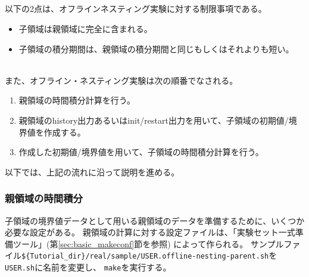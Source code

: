 \subsection{\SubsecOflineNesting} \label{subsec:nest_offline}

以下の2点は、オフラインネスティング実験に対する制限事項である。
\begin{itemize}
 \item 子領域は親領域に完全に含まれる。
 \item 子領域の積分期間は、親領域の積分期間と同じもしくはそれよりも短い。
\end{itemize}

~\\
また、オフライン・ネスティング実験は次の順番でなされる。
\begin{enumerate}
 \item 親領域の時間積分計算を行う。
 \item 親領域のhistory出力あるいはinit/restart出力を用いて、子領域の初期値/境界値を作成する。
 \item 作成した初期値/境界値を用いて、子領域の時間積分計算を行う。
\end{enumerate}
以下では、上記の流れに沿って説明を進める。


\subsubsection{親領域の時間積分}
子領域の境界値データとして用いる親領域のデータを準備するために、いくつか必要な設定がある。
親領域の計算に対する設定ファイルは、「実験セット一式準備ツール」(第\ref{sec:basic_makeconf}節を参照)
によって作られる。
サンプルファイル\verb|${Tutorial_dir}/real/sample/USER.offline-nesting-parent.sh|を \\
\verb|USER.sh|に名前を変更し、 \verb|make|を実行する。

